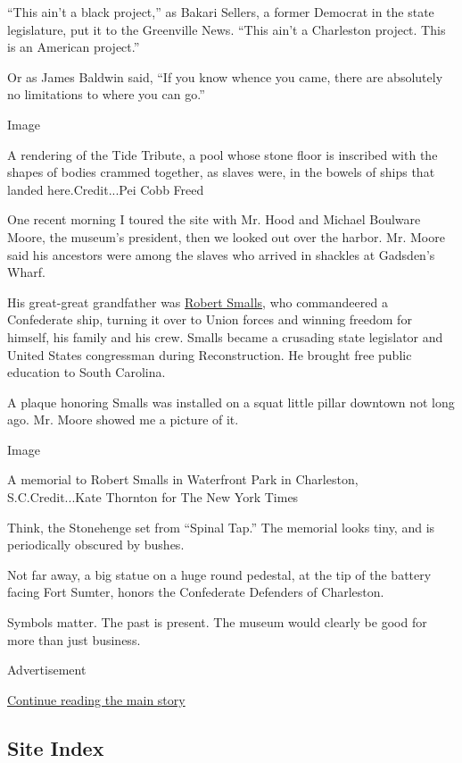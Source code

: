 ``This ain't a black project,'' as Bakari Sellers, a former Democrat in
the state legislature, put it to the Greenville News. ``This ain't a
Charleston project. This is an American project.''

Or as James Baldwin said, ``If you know whence you came, there are
absolutely no limitations to where you can go.''

Image

A rendering of the Tide Tribute, a pool whose stone floor is inscribed
with the shapes of bodies crammed together, as slaves were, in the
bowels of ships that landed here.Credit...Pei Cobb Freed

One recent morning I toured the site with Mr. Hood and Michael Boulware
Moore, the museum's president, then we looked out over the harbor. Mr.
Moore said his ancestors were among the slaves who arrived in shackles
at Gadsden's Wharf.

His great-great grandfather was
\href{https://www.smithsonianmag.com/history/thrilling-tale-how-robert-smalls-heroically-sailed-stolen-confederate-ship-freedom-180963689/}{Robert
Smalls}, who commandeered a Confederate ship, turning it over to Union
forces and winning freedom for himself, his family and his crew. Smalls
became a crusading state legislator and United States congressman during
Reconstruction. He brought free public education to South Carolina.

A plaque honoring Smalls was installed on a squat little pillar downtown
not long ago. Mr. Moore showed me a picture of it.

Image

A memorial to Robert Smalls in Waterfront Park in Charleston,
S.C.Credit...Kate Thornton for The New York Times

Think, the Stonehenge set from ``Spinal Tap.'' The memorial looks tiny,
and is periodically obscured by bushes.

Not far away, a big statue on a huge round pedestal, at the tip of the
battery facing Fort Sumter, honors the Confederate Defenders of
Charleston.

Symbols matter. The past is present. The museum would clearly be good
for more than just business.

Advertisement

\protect\hyperlink{after-bottom}{Continue reading the main story}

\hypertarget{site-index}{%
\subsection{Site Index}\label{site-index}}

